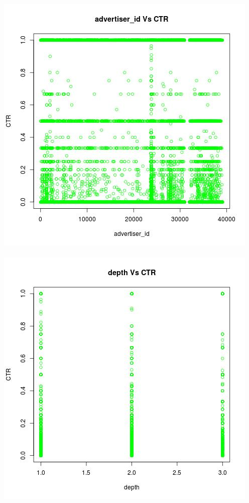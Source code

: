 \documentclass[10pt]{article}
\begin{document}
\includegraphics[scale=0.5]{advertiser_id_Vs_CTR}\\\\
\includegraphics[scale=0.5]{depth_Vs_CTR}
\end{document}
